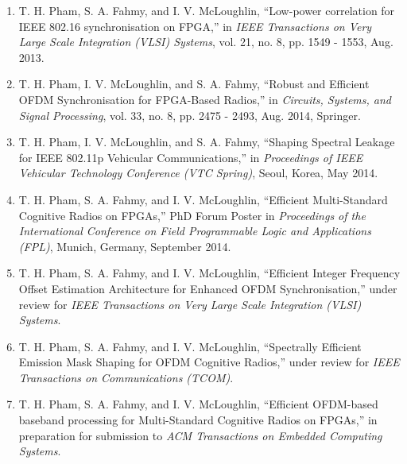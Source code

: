 \begin{enumerate}

\item  T. H. Pham, S. A. Fahmy, and I. V. McLoughlin, ``Low-power correlation for IEEE 802.16 synchronisation on FPGA,'' in \textit{IEEE Transactions on Very Large Scale Integration (VLSI) Systems}, vol. 21, no. 8, pp. 1549 - 1553, Aug. 2013.

\item T. H. Pham, I. V. McLoughlin, and S. A. Fahmy, ``Robust and Efficient OFDM Synchronisation for FPGA-Based Radios,'' in \textit{Circuits, Systems, and Signal Processing}, vol. 33, no. 8, pp. 2475 - 2493, Aug. 2014, Springer.

\item  T. H. Pham, I. V. McLoughlin, and S. A. Fahmy, ``Shaping Spectral Leakage for IEEE 802.11p Vehicular Communications,'' in \textit{Proceedings of IEEE Vehicular Technology Conference (VTC Spring)}, Seoul, Korea, May 2014.

\item T. H. Pham, S. A. Fahmy, and I. V. McLoughlin, ``Efficient Multi-Standard Cognitive Radios on FPGAs,'' PhD Forum Poster in \textit{Proceedings of the International Conference on Field Programmable Logic and Applications (FPL)}, Munich, Germany, September 2014.

\item T. H. Pham, S. A. Fahmy, and I. V. McLoughlin, ``Efficient Integer Frequency Offset Estimation Architecture for Enhanced OFDM Synchronisation,'' under review for \textit{IEEE Transactions on Very Large Scale Integration (VLSI) Systems}.

\item T. H. Pham, S. A. Fahmy, and I. V. McLoughlin, ``Spectrally Efficient Emission Mask Shaping for OFDM Cognitive Radios,'' under review for \textit{IEEE Transactions on Communications (TCOM)}.

\item T. H. Pham, S. A. Fahmy, and I. V. McLoughlin, ``Efficient OFDM-based baseband processing for Multi-Standard Cognitive Radios on FPGAs,'' in preparation for submission to \emph{ACM Transactions on Embedded Computing Systems}.

\end{enumerate}
